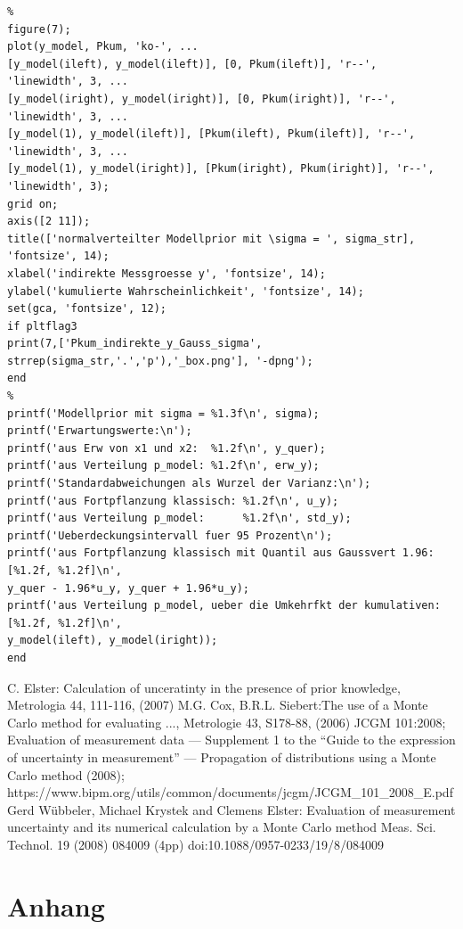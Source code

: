 \begin{verbatim}
%
figure(7);
plot(y_model, Pkum, 'ko-', ...
[y_model(ileft), y_model(ileft)], [0, Pkum(ileft)], 'r--', 'linewidth', 3, ...
[y_model(iright), y_model(iright)], [0, Pkum(iright)], 'r--', 'linewidth', 3, ...
[y_model(1), y_model(ileft)], [Pkum(ileft), Pkum(ileft)], 'r--', 'linewidth', 3, ...
[y_model(1), y_model(iright)], [Pkum(iright), Pkum(iright)], 'r--', 'linewidth', 3);
grid on;
axis([2 11]);
title(['normalverteilter Modellprior mit \sigma = ', sigma_str], 'fontsize', 14);
xlabel('indirekte Messgroesse y', 'fontsize', 14);
ylabel('kumulierte Wahrscheinlichkeit', 'fontsize', 14);
set(gca, 'fontsize', 12);
if pltflag3
print(7,['Pkum_indirekte_y_Gauss_sigma', strrep(sigma_str,'.','p'),'_box.png'], '-dpng');
end
%
printf('Modellprior mit sigma = %1.3f\n', sigma);
printf('Erwartungswerte:\n');
printf('aus Erw von x1 und x2:  %1.2f\n', y_quer);
printf('aus Verteilung p_model: %1.2f\n', erw_y);
printf('Standardabweichungen als Wurzel der Varianz:\n');
printf('aus Fortpflanzung klassisch: %1.2f\n', u_y);
printf('aus Verteilung p_model:      %1.2f\n', std_y);
printf('Ueberdeckungsintervall fuer 95 Prozent\n');
printf('aus Fortpflanzung klassisch mit Quantil aus Gaussvert 1.96:  [%1.2f, %1.2f]\n',
y_quer - 1.96*u_y, y_quer + 1.96*u_y);
printf('aus Verteilung p_model, ueber die Umkehrfkt der kumulativen: [%1.2f, %1.2f]\n',
y_model(ileft), y_model(iright));
end
\end{verbatim}

\begin{thebibliography}{------}
     C. Elster: Calculation of unceratinty
	in the presence of prior knowledge, Metrologia 44, 111-116, (2007)
     M.G. Cox, B.R.L. Siebert:The use of
    a Monte Carlo method for evaluating ..., Metrologie 43, S178-88,
    (2006)
    JCGM 101:2008; Evaluation of measurement data — Supplement 1 to the 
    “Guide to the expression of uncertainty in measurement” — 
    Propagation of distributions using a Monte Carlo method (2008); \newline 
    https://www.bipm.org/utils/common/documents/jcgm/JCGM\_101\_2008\_E.pdf
     Gerd Wübbeler, Michael Krystek and Clemens Elster: Evaluation of measurement uncertainty
    and its numerical calculation by a Monte Carlo method
    Meas. Sci. Technol. 19 (2008) 084009 (4pp)
    doi:10.1088/0957-0233/19/8/084009
    \end{thebibliography}

\newpage
\section{Anhang}
